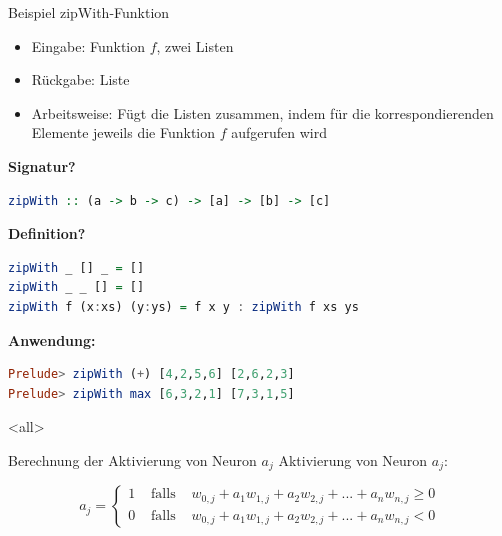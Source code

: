 \documentclass[svgnames,smaller,ngerman]{beamer}
\newcommand{\bsp}[1]{\vfill\hfill\beamerbutton{#1}}
\newcommand{\Alert}[1]{\alert{\textbf{#1}}\xspace}
\begin{document}
\begin{frame}[fragile]{Beispiel zipWith-Funktion}
    \begin{itemize}
        \item Eingabe: Funktion $f$, zwei Listen
        \item Rückgabe: Liste
        \item Arbeitsweise: Fügt die Listen zusammen, indem für die
              korrespondierenden Elemente jeweils die Funktion  $f$ aufgerufen
              wird
    \end{itemize}

    \smallskip

    \Alert{Signatur?}
    \pause
    \begin{small}
    \begin{lstlisting}[language=Haskell]
zipWith :: (a -> b -> c) -> [a] -> [b] -> [c]
    \end{lstlisting}
    \end{small}

    \Alert{Definition?}
    \pause
    \begin{small}
    \begin{lstlisting}[language=Haskell]
zipWith _ [] _ = []
zipWith _ _ [] = []
zipWith f (x:xs) (y:ys) = f x y : zipWith f xs ys
    \end{lstlisting}
    \end{small}

    \Alert{Anwendung:}
    \begin{small}
    \begin{lstlisting}[language=Haskell]
Prelude> zipWith (+) [4,2,5,6] [2,6,2,3]
Prelude> zipWith max [6,3,2,1] [7,3,1,5]
    \end{lstlisting}
    \end{small}
    \mode<all>

    \bsp{ghci}
\end{frame}


\begin{frame}{Berechnung der Aktivierung von Neuron \(a_j\)}
    Aktivierung von Neuron \(a_j\):

    \[a_j = \left\{
    \begin{array}{lll}
        1 & \text{ falls } & w_{0,j} + a_1 w_{1,j} + a_2 w_{2,j} + ... + a_n w_{n,j} \ge 0\\
        0 & \text{ falls } & w_{0,j} + a_1 w_{1,j} + a_2 w_{2,j} + ... + a_n w_{n,j} < 0
    \end{array}
    \right.\]
\end{frame}
\end{document}
